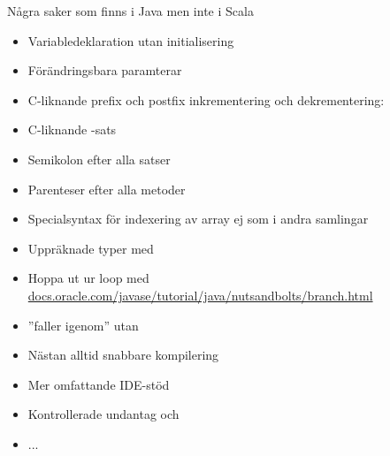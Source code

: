 \begin{Slide}{Några saker som finns i Java men inte i Scala}\SlideFontSmall
\vspace{-0.7em}\begin{multicols}{2}
\begin{itemize}
\item Variabledeklaration utan initialisering

\item Förändringsbara paramterar

\item C-liknande prefix och postfix inkrementering och dekrementering: 

\item C-liknande -sats

\item Semikolon efter alla satser

\item Parenteser efter alla metoder

\item Specialsyntax för indexering av array \code{[]} ej som i andra samlingar

\item Uppräknade typer med {\texttt{\bfseries{\color{eclipsepurple}{enum}}}}

\item Hoppa ut ur loop med  \\ \href{https://docs.oracle.com/javase/tutorial/java/nutsandbolts/branch.html}{docs.oracle.com/javase/tutorial/java/nutsandbolts/branch.html}

\item {} ''faller igenom'' utan 

\item Nästan alltid snabbare kompilering

\item Mer omfattande IDE-stöd

\item Kontrollerade undantag  och 

\item ...
\end{itemize}

\end{multicols}
\end{Slide}



